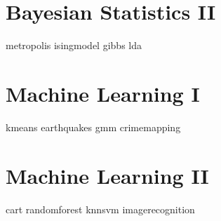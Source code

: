\documentclass[nociteref]{newsiambook}
\begin{document}
\part{Bayesian Statistics II}
{metropolis}
{isingmodel}
{gibbs}
{lda}

\part{Machine Learning I}
{kmeans}
{earthquakes}
{gmm}
{crimemapping}

\part{Machine Learning II}
{cart}
{randomforest}
{knnsvm}
{imagerecognition}
\end{document}

